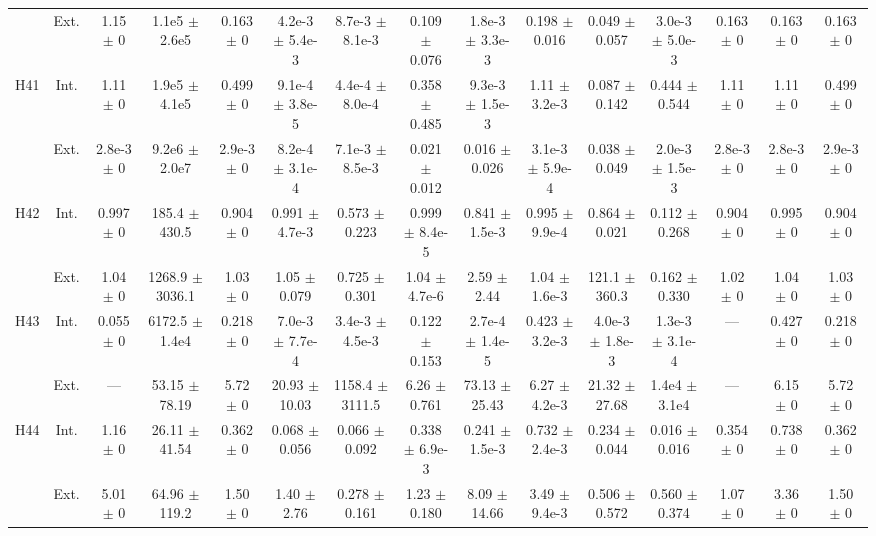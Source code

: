 \begin{table}[htbp]
{\begin{tabular}{@{}ccccccccccccccc@{}}
 & Ext. & 1.15 $\pm$ 0 & 1.1e5 $\pm$ 2.6e5 & 0.163 $\pm$ 0 & 4.2e-3 $\pm$ 5.4e-3 & 8.7e-3 $\pm$ 8.1e-3 & 0.109 $\pm$ 0.076 & 1.8e-3 $\pm$ 3.3e-3 & 0.198 $\pm$ 0.016 & 0.049 $\pm$ 0.057 & 3.0e-3 $\pm$ 5.0e-3 & 0.163 $\pm$ 0 & 0.163 $\pm$ 0 & 0.163 $\pm$ 0 \\
\cline{2-15}
\multirow{2}{*}{H41} & Int. & 1.11 $\pm$ 0 & 1.9e5 $\pm$ 4.1e5 & 0.499 $\pm$ 0 & 9.1e-4 $\pm$ 3.8e-5 & 4.4e-4 $\pm$ 8.0e-4 & 0.358 $\pm$ 0.485 & 9.3e-3 $\pm$ 1.5e-3 & 1.11 $\pm$ 3.2e-3 & 0.087 $\pm$ 0.142 & 0.444 $\pm$ 0.544 & 1.11 $\pm$ 0 & 1.11 $\pm$ 0 & 0.499 $\pm$ 0 \\
 & Ext. & 2.8e-3 $\pm$ 0 & 9.2e6 $\pm$ 2.0e7 & 2.9e-3 $\pm$ 0 & 8.2e-4 $\pm$ 3.1e-4 & 7.1e-3 $\pm$ 8.5e-3 & 0.021 $\pm$ 0.012 & 0.016 $\pm$ 0.026 & 3.1e-3 $\pm$ 5.9e-4 & 0.038 $\pm$ 0.049 & 2.0e-3 $\pm$ 1.5e-3 & 2.8e-3 $\pm$ 0 & 2.8e-3 $\pm$ 0 & 2.9e-3 $\pm$ 0 \\
\cline{2-15}
\multirow{2}{*}{H42} & Int. & 0.997 $\pm$ 0 & 185.4 $\pm$ 430.5 & 0.904 $\pm$ 0 & 0.991 $\pm$ 4.7e-3 & 0.573 $\pm$ 0.223 & 0.999 $\pm$ 8.4e-5 & 0.841 $\pm$ 1.5e-3 & 0.995 $\pm$ 9.9e-4 & 0.864 $\pm$ 0.021 & 0.112 $\pm$ 0.268 & 0.904 $\pm$ 0 & 0.995 $\pm$ 0 & 0.904 $\pm$ 0 \\
 & Ext. & 1.04 $\pm$ 0 & 1268.9 $\pm$ 3036.1 & 1.03 $\pm$ 0 & 1.05 $\pm$ 0.079 & 0.725 $\pm$ 0.301 & 1.04 $\pm$ 4.7e-6 & 2.59 $\pm$ 2.44 & 1.04 $\pm$ 1.6e-3 & 121.1 $\pm$ 360.3 & 0.162 $\pm$ 0.330 & 1.02 $\pm$ 0 & 1.04 $\pm$ 0 & 1.03 $\pm$ 0 \\
\cline{2-15}
\multirow{2}{*}{H43} & Int. & 0.055 $\pm$ 0 & 6172.5 $\pm$ 1.4e4 & 0.218 $\pm$ 0 & 7.0e-3 $\pm$ 7.7e-4 & 3.4e-3 $\pm$ 4.5e-3 & 0.122 $\pm$ 0.153 & 2.7e-4 $\pm$ 1.4e-5 & 0.423 $\pm$ 3.2e-3 & 4.0e-3 $\pm$ 1.8e-3 & 1.3e-3 $\pm$ 3.1e-4 & --- & 0.427 $\pm$ 0 & 0.218 $\pm$ 0 \\
 & Ext. & --- & 53.15 $\pm$ 78.19 & 5.72 $\pm$ 0 & 20.93 $\pm$ 10.03 & 1158.4 $\pm$ 3111.5 & 6.26 $\pm$ 0.761 & 73.13 $\pm$ 25.43 & 6.27 $\pm$ 4.2e-3 & 21.32 $\pm$ 27.68 & 1.4e4 $\pm$ 3.1e4 & --- & 6.15 $\pm$ 0 & 5.72 $\pm$ 0 \\
\cline{2-15}
\multirow{2}{*}{H44} & Int. & 1.16 $\pm$ 0 & 26.11 $\pm$ 41.54 & 0.362 $\pm$ 0 & 0.068 $\pm$ 0.056 & 0.066 $\pm$ 0.092 & 0.338 $\pm$ 6.9e-3 & 0.241 $\pm$ 1.5e-3 & 0.732 $\pm$ 2.4e-3 & 0.234 $\pm$ 0.044 & 0.016 $\pm$ 0.016 & 0.354 $\pm$ 0 & 0.738 $\pm$ 0 & 0.362 $\pm$ 0 \\
 & Ext. & 5.01 $\pm$ 0 & 64.96 $\pm$ 119.2 & 1.50 $\pm$ 0 & 1.40 $\pm$ 2.76 & 0.278 $\pm$ 0.161 & 1.23 $\pm$ 0.180 & 8.09 $\pm$ 14.66 & 3.49 $\pm$ 9.4e-3 & 0.506 $\pm$ 0.572 & 0.560 $\pm$ 0.374 & 1.07 $\pm$ 0 & 3.36 $\pm$ 0 & 1.50 $\pm$ 0 \\

\end{tabular}}
\end{table}
